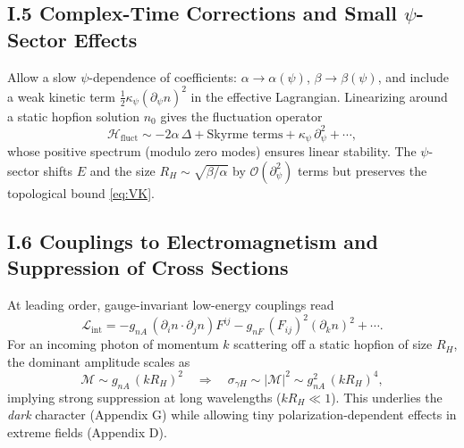 \subsection*{I.5 Complex-Time Corrections and Small $\psi$-Sector Effects}
Allow a slow $\psi$-dependence of coefficients: $\alpha\to\alpha(\psi)$, $\beta\to\beta(\psi)$, and include a weak kinetic term $\frac12\kappa_\psi(\partial_\psi n)^2$ in the effective Lagrangian. 
Linearizing around a static hopfion solution $n_0$ gives the fluctuation operator
\begin{equation}
\mathcal{H}_{\mathrm{fluct}} \sim -2\alpha\,\Delta + \text{Skyrme terms} + \kappa_\psi\,\partial_\psi^2 + \cdots,
\end{equation}
whose positive spectrum (modulo zero modes) ensures linear stability. 
The $\psi$-sector shifts $E$ and the size $R_H\sim\sqrt{\beta/\alpha}$ by $\mathcal{O}(\partial_\psi^2)$ terms but preserves the topological bound \eqref{eq:VK}.

\subsection*{I.6 Couplings to Electromagnetism and Suppression of Cross Sections}
At leading order, gauge-invariant low-energy couplings read
\begin{equation}
\mathcal{L}_{\mathrm{int}}=- g_{nA}\,(\partial_i n\cdot\partial_j n) F^{ij} - g_{nF}\, (F_{ij})^2 (\partial_k n)^2 + \cdots.
\label{eq:Lint}
\end{equation}
For an incoming photon of momentum $k$ scattering off a static hopfion of size $R_H$, the dominant amplitude scales as
\begin{equation}
\mathcal{M} \sim g_{nA}\, (k R_H)^2\quad\Rightarrow\quad \sigma_{\gamma H}\sim |\mathcal{M}|^2 \sim g_{nA}^2\,(k R_H)^4,
\end{equation}
implying strong suppression at long wavelengths ($kR_H\ll 1$). 
This underlies the \emph{dark} character (Appendix G) while allowing tiny polarization-dependent effects in extreme fields (Appendix D).

